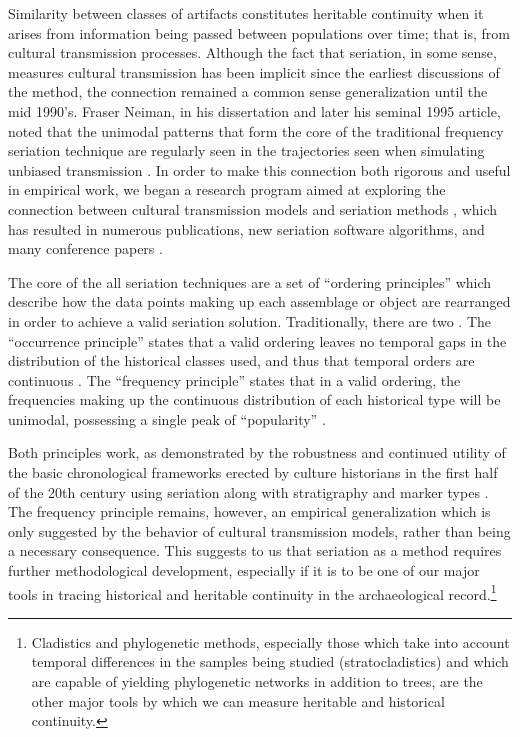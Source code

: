 \documentclass[graybox,natbib]{svmult}
\begin{document}
Similarity between classes of artifacts constitutes heritable continuity
when it arises from information being passed between populations over
time; that is, from cultural transmission processes. Although the fact
that seriation, in some sense, measures cultural transmission has been
implicit since the earliest discussions of the method, the connection
remained a common sense generalization until the mid 1990's. Fraser
Neiman, in his dissertation and later his seminal 1995 article, noted
that the unimodal patterns that form the core of the traditional
frequency seriation technique are regularly seen in the trajectories
seen when simulating unbiased transmission \citep{Neiman1995}. In order
to make this connection both rigorous and useful in empirical work, we
began a research program aimed at exploring the connection between
cultural transmission models and seriation methods
\citep{Lipo1997Population}, which has resulted in numerous publications,
new seriation software algorithms, and many conference papers
\citep{huntmadsenlipo1995a, lipomadsenhunt1995b, Lipo2008, Lipo2001, Lipo2001a, Lipo2005, lipomadsen1997, lipomadsendunnell2015, Madsen2014, madsenlipo2015b, Madsen2008, o2015design}.

The core of the all seriation techniques are a set of ``ordering
principles'' which describe how the data points making up each
assemblage or object are rearranged in order to achieve a valid
seriation solution. Traditionally, there are two
\citep{Dunnell:1970aa, Rouse1967, Whitlam:1981vs}. The ``occurrence
principle'' states that a valid ordering leaves no temporal gaps in the
distribution of the historical classes used, and thus that temporal
orders are continuous
\citep{dempsey1963statistical, rowe1959archaeological}. The ``frequency
principle'' states that in a valid ordering, the frequencies making up
the continuous distribution of each historical type will be unimodal,
possessing a single peak of ``popularity'' \citep{Nelson1916}.

Both principles work, as demonstrated by the robustness and continued
utility of the basic chronological frameworks erected by culture
historians in the first half of the 20th century using seriation along
with stratigraphy and marker types \citep{lyman1997rise}. The frequency
principle remains, however, an empirical generalization which is only
suggested by the behavior of cultural transmission models, rather than
being a necessary consequence. This suggests to us that seriation as a
method requires further methodological development, especially if it is
to be one of our major tools in tracing historical and heritable
continuity in the archaeological record.\footnote{Cladistics and
  phylogenetic methods, especially those which take into account
  temporal differences in the samples being studied (stratocladistics)
  and which are capable of yielding phylogenetic networks in addition to
  trees, are the other major tools by which we can measure heritable and
  historical continuity.}
\end{document}

